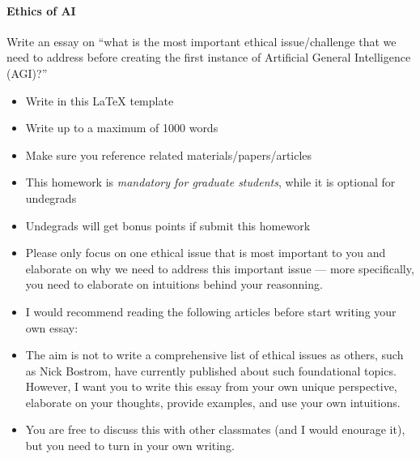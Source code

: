 \paragraph{Ethics of AI}

Write an essay on ``what is the most important ethical issue/challenge that we need to address before creating the first instance of Artificial General Intelligence (AGI)?'' 

\begin{itemize}
	\item Write in this LaTeX template
	\item Write up to a maximum of 1000 words
	\item Make sure you reference related materials/papers/articles
	\item This homework is \emph{mandatory for graduate students}, while it is optional for undegrads 
	\item Undegrads will get bonus points if submit this homework
	\item Please only focus on one ethical issue that is most important to you and elaborate on why we need to address this important issue --- more specifically, you need to elaborate on intuitions behind your reasonning.
	\item I would recommend reading the following articles before start writing your own essay: \cite{bostrom2014ethics,taylor2016alignment,russell2015ethics,lachat1986artificial}
	\item The aim is not to write a comprehensive list of ethical issues as others, such as Nick Bostrom, have currently published about such foundational topics. However, I want you to write this essay from your own unique perspective, elaborate on your thoughts, provide examples, and use your own intuitions.
	\item You are free to discuss this with other classmates (and I would enourage it), but you need to turn in your own writing.
\end{itemize}
